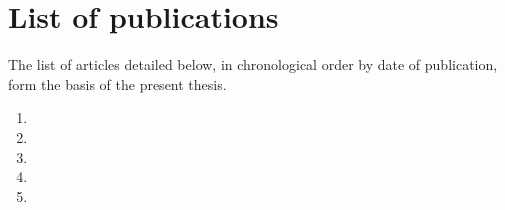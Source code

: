 \documentclass[
	11pt, %
	a4paper,
]{LegrandOrangeBook}
\begin{document}


\newpage
\thispagestyle{plain} %
\mbox{}











\chapterimage{} %
\chapterspaceabove{6.75cm} %
\chapterspacebelow{7.25cm} %

\chapter*{List of publications}

The list of articles detailed below, in chronological order by date of publication, form the basis of the present thesis.
\vspace{0.5 cm}

\begin{enumerate}
	\item {}
	\vspace{0.5 cm}
	\item {}
	\vspace{0.5 cm}
	\item {}
	\vspace{0.5 cm}
	\item {}
	\vspace{0.5 cm}
	\item {}
	\vspace{0.5 cm}
\end{enumerate}
\end{document}
